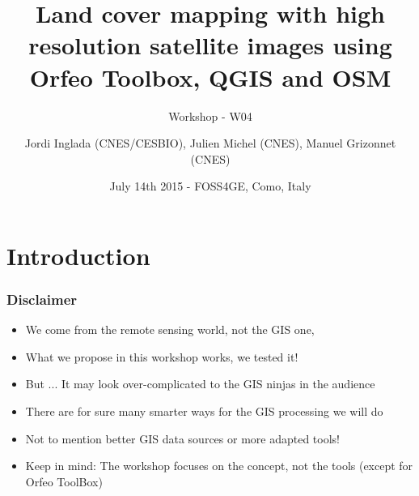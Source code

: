 \documentclass[8pt]{beamer}
\title{Land cover mapping with high resolution satellite images using Orfeo Toolbox, QGIS and OSM}
\subtitle{Workshop - W04}
\author{Jordi Inglada (CNES/CESBIO), Julien Michel (CNES), Manuel Grizonnet (CNES)}%
\date{July 14th 2015 - FOSS4GE, Como, Italy}
\begin{document}
\begin{frame}
\titlepage
\end{frame}

\section*{Introduction}

\begin{frame}
\frametitle{Disclaimer}

\begin{itemize}
\item We come from the remote sensing world, not the GIS one,
\item What we propose in this workshop works, we tested it! 
\item But ... It may look over-complicated to the GIS ninjas in the audience
\item There are for sure many smarter ways for the GIS processing we will do
\item Not to mention better GIS data sources or more adapted tools!
\item Keep in mind: The workshop focuses on the concept, not the tools (except for Orfeo ToolBox)
\end{itemize}

\end{frame}
\end{document}
